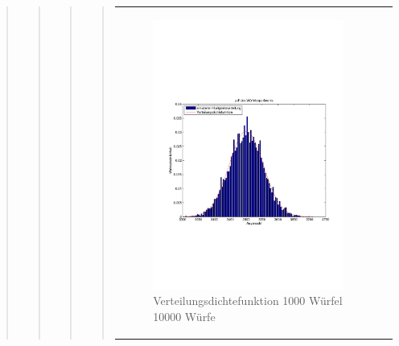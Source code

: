 \begin{quote}
\begin{quote}
\begin{quote}
\begin{quote}
\begin{center}
\begin{tabular}{ll}
            \hspace{-4em}
                \begin{minipage}{0.6\textwidth}

                    \begin{figure}[H]
                        \label{fig:}
                        \includegraphics[scale=0.3]{./Bilder/1000wuerfelpdf} %
                        \caption{Verteilungsdichtefunktion 1000 Würfel 10000 Würfe}
                    \end{figure}

                \end{minipage}

            \end{tabular}
            \end{center}
		

\end{quote}
\end{quote}
\end{quote}
\end{quote}
